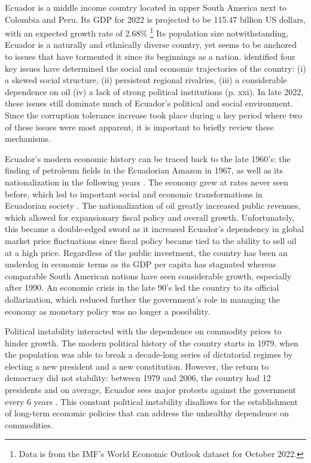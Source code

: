 \documentclass[12pt,a4]{article}\usepackage[]{graphicx}\usepackage[]{xcolor}
\begin{document}
Ecuador is a middle income country located in upper South America next to Colombia and Peru. Its GDP for 2022 is projected to be 115.47 billion US dollars, with an expected growth rate of 2.68\% \footnote{Data is from the IMF's World Economic Outlook dataset for October 2022.} Its population size notwithstanding, Ecuador is a naturally and ethnically diverse country, yet seems to be anchored to issues that have tormented it since its beginnings as a nation. \textcite{FederalResearchDivision.1991} identified four key issues have determined the social and economic trajectories of the country: (i) a skewed social structure, (ii) persistent regional rivalries, (iii) a considerable dependence on oil (iv) a lack of strong political institutions (p. xxi). In late 2022, these issues still dominate much of Ecuador's political and social environment. Since the corruption tolerance increase took place during a key period where two of these issues were most apparent, it is important to briefly review these mechanisms.

Ecuador's modern economic history can be traced back to the late 1960's: the finding of petroleum fields in the Ecuadorian Amazon in 1967, as well as its nationalization in the following years \parencite{EmpresaPublicaPetroEcuador.2013}. The economy grew at rates never seen before, which led to important social and economic transformations in Ecuadorian society \parencite{Hurtado.2007, FederalResearchDivision.1991}. The nationalization of oil greatly increased public revenues, which allowed for expansionary fiscal policy and overall growth. Unfortunately, this became a double-edged sword as it increased Ecuador’s dependency in global market price fluctuations since fiscal policy became tied to the ability to sell oil at a high price. Regardless of the public investment, the country has been an underdog in economic terms as its GDP per capita has stagnated whereas comparable South American nations have seen considerable growth, especially after 1990. An economic crisis in the late 90's led the country to its official dollarization, which reduced further the government's role in managing the economy as monetary policy was no longer a possibility. 

Political instability interacted with the dependence on commodity prices to hinder growth. The modern political history of the country starts in 1979, when the population was able to break a decade-long series of dictatorial regimes by electing a new president and a new constitution. However, the return to democracy did not stability: between 1979 and 2006, the country had 12 presidents and on average, Ecuador sees major protests against the government every 6 years \parencite{Loaiza.2022}. This constant political instability disallows for the establishment of long-term economic policies that can address the unhealthy dependence on commodities.
\end{document}
